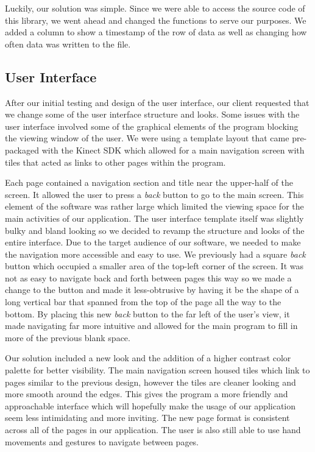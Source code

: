 \documentclass[onecolumn, draftclsnofoot,10pt, compsoc]{IEEEtran}
\begin{document}
Luckily, our solution was simple. Since we were able to access the source code of this library, we went ahead and changed the functions to serve our purposes. We added a column to show a timestamp of the row of data as well as changing how often data was written to the file.

\subsection{User Interface}
After our initial testing and design of the user interface, our client requested that we change some of the user interface structure and looks. Some issues with the user interface involved some of the graphical elements of the program blocking the viewing window of the user. We were using a template layout that came pre-packaged with the Kinect SDK which allowed for a main navigation screen with tiles that acted as links to other pages within the program\cite{KinectDevelop}.

Each page contained a navigation section and title near the upper-half of the screen. It allowed the user to press a \textit{back} button to go to the main screen. This element of the software was rather large which limited the viewing space for the main activities of our application. The user interface template itself was slightly bulky and bland looking so we decided to revamp the structure and looks of the entire interface. Due to the target audience of our software, we needed to make the navigation more accessible and easy to use. We previously had a square \textit{back} button which occupied a smaller area of the top-left corner of the screen. It was not as easy to navigate back and forth between pages this way so we made a change to the button and made it less-obtrusive by having it be the shape of a long vertical bar that spanned from the top of the page all the way to the bottom. By placing this new \textit{back} button to the far left of the user's view, it made navigating far more intuitive and allowed for the main program to fill in more of the previous blank space.

Our solution included a new look and the addition of a higher contrast color palette for better visibility. The main navigation screen housed tiles which link to pages similar to the previous design, however the tiles are cleaner looking and more smooth around the edges. This gives the program a more friendly and approachable interface which will hopefully make the usage of our application seem less intimidating and more inviting. The new page format is consistent across all of the pages in our application. The user is also still able to use hand movements and gestures to navigate between pages.
\end{document}
